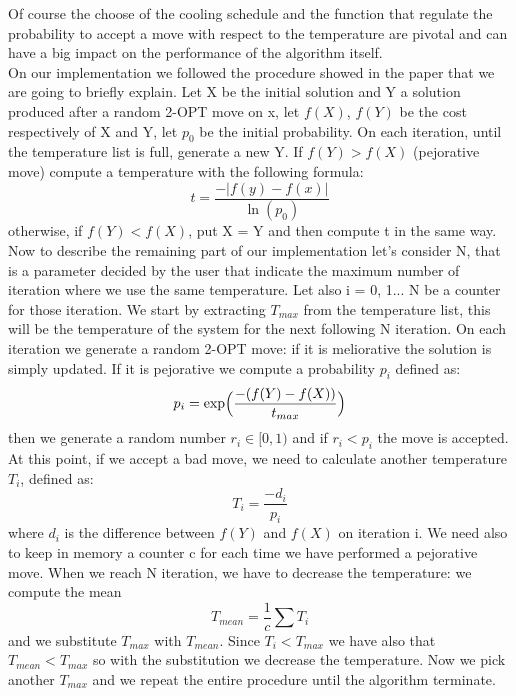 \noindent Of course the choose of the cooling schedule and the function that regulate the probability to accept a move with respect to the temperature are pivotal and can have a big impact on the performance of the algorithm itself. \\
On our implementation we followed the procedure showed in the paper %
that we are going to briefly explain.
Let X be the initial solution and Y a solution produced after a random 2-OPT move on x, let $f(X)$, $f(Y)$ be the cost respectively of X and Y, let $p_0$ be the initial probability. On each iteration, until the temperature list is full, generate a new Y. If $f(Y) > f(X)$ (pejorative move) compute a temperature with the following formula:
\begin{equation*}
t = \frac{-\vert f(y) - f(x) \vert}{\ln{(p_0)}}
\end{equation*}
otherwise, if $f(Y) < f(X)$, put X = Y and then compute t in the same way.
Now to describe the remaining part of our implementation let's consider N, that is a parameter decided by the user that indicate the maximum number of iteration where we use the same temperature. Let also i = 0, 1... N be a counter for those iteration. We start by extracting $T_{max}$ from the temperature list, this will be the temperature of the system for the next following N iteration. On each iteration we generate a random 2-OPT move: if it is meliorative the solution is simply updated. If it is pejorative we compute a probability $p_i$ defined as:
\begin{equation*}
p_i = \exp \Bigl( \frac{-(f(Y)-f(X))}{t_{max}} \Bigr)
\end{equation*}
then we generate a random number $r_i \in [0, 1)$ and if $r_i < p_i$ the move is accepted.
At this point, if we accept a bad move, we need to calculate another temperature $T_i$, defined as:
\begin{equation*}
T_i = \frac{-d_i}{p_i}
\end{equation*} 
where $d_i$ is the difference between $f(Y)$ and $f(X)$ on iteration i. We need also to keep in memory a counter c for each time we have performed a pejorative move. When we reach N iteration, we have to decrease the temperature: we compute the mean
\begin{equation*}
T_{mean} = \frac{1}{c} \sum T_i
\end{equation*}
and we substitute $T_{max}$ with $T_{mean}$. Since $T_i < T_{max}$ we have also that $T_{mean} < T_{max}$ so with the substitution we decrease the temperature. Now we pick another $T_{max}$ and we repeat the entire procedure until the algorithm terminate.



